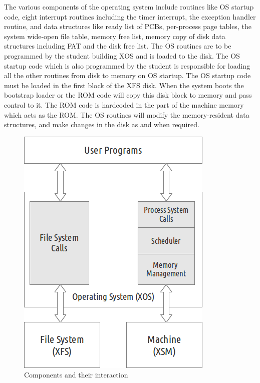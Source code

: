 \documentclass[10pt]{report}
\begin{document}
The various components of the operating system include routines like OS startup code, eight interrupt routines including the timer interrupt, the exception handler routine, and data structures like ready list of PCBs, per-process page tables, the system wide-open file table, memory free list, memory copy of disk data structures including FAT and the disk free list. The OS routines are to be programmed by the student building XOS and is loaded to the disk. The OS startup code which is also programmed by the student is responsible for loading all the other routines from disk to memory on OS startup. The OS startup code must be loaded in the first block of the XFS disk. When the system boots the bootstrap loader or the ROM code will copy this disk block to memory and pass control to it. The ROM code is hardcoded in the part of the machine memory which acts as the ROM. The OS routines will modify the memory-resident data structures, and make changes in the disk as and when required. \\


\begin{figure}[hbtp]
\centering
\includegraphics[scale=0.55]{xosstructure.png}
\caption{Components and their interaction}
\end{figure}
\end{document}
